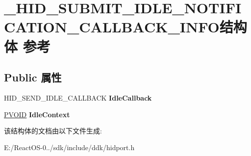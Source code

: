 \hypertarget{struct___h_i_d___s_u_b_m_i_t___i_d_l_e___n_o_t_i_f_i_c_a_t_i_o_n___c_a_l_l_b_a_c_k___i_n_f_o}{}\section{\+\_\+\+H\+I\+D\+\_\+\+S\+U\+B\+M\+I\+T\+\_\+\+I\+D\+L\+E\+\_\+\+N\+O\+T\+I\+F\+I\+C\+A\+T\+I\+O\+N\+\_\+\+C\+A\+L\+L\+B\+A\+C\+K\+\_\+\+I\+N\+F\+O结构体 参考}
\label{struct___h_i_d___s_u_b_m_i_t___i_d_l_e___n_o_t_i_f_i_c_a_t_i_o_n___c_a_l_l_b_a_c_k___i_n_f_o}
\subsection*{Public 属性}
\begin{DoxyCompactItemize}
\item 
\mbox{\label{struct___h_i_d___s_u_b_m_i_t___i_d_l_e___n_o_t_i_f_i_c_a_t_i_o_n___c_a_l_l_b_a_c_k___i_n_f_o_aa50acd4f9936be3e07aefbb662195aa1}} 
H\+I\+D\+\_\+\+S\+E\+N\+D\+\_\+\+I\+D\+L\+E\+\_\+\+C\+A\+L\+L\+B\+A\+CK {\bfseries Idle\+Callback}
\item 
\mbox{\label{struct___h_i_d___s_u_b_m_i_t___i_d_l_e___n_o_t_i_f_i_c_a_t_i_o_n___c_a_l_l_b_a_c_k___i_n_f_o_ab7282009ce4060c648a615c88e545696}} 
\hyperlink{interfacevoid}{P\+V\+O\+ID} {\bfseries Idle\+Context}
\end{DoxyCompactItemize}


该结构体的文档由以下文件生成\+:\begin{DoxyCompactItemize}
\item 
E\+:/\+React\+O\+S-\/0../sdk/include/ddk/hidport.\+h\end{DoxyCompactItemize}
